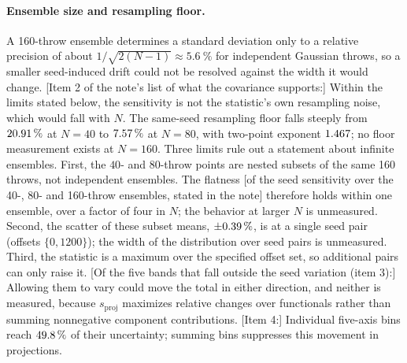 \paragraph{Ensemble size and resampling floor.} A 160-throw ensemble determines a standard deviation only to a relative precision of about $1/\sqrt{2(N-1)}\approx\SI{5.6}{\percent}$ for independent Gaussian throws, so a smaller seed-induced drift could not be resolved against the width it would change. [Item 2 of the note's list of what the covariance supports:] Within the limits stated below, the sensitivity is not the statistic's own resampling noise, which would fall with $N$. The same-seed resampling floor falls steeply from $20.91\,\%$ at $N=40$ to $7.57\,\%$ at $N=80$, with two-point exponent $1.467$; no floor measurement exists at $N=160$. Three limits rule out a statement about infinite ensembles. First, the $40$- and $80$-throw points are nested subsets of the same 160 throws, not independent ensembles. The flatness [of the seed sensitivity over the 40-, 80- and 160-throw ensembles, stated in the note] therefore holds within one ensemble, over a factor of four in $N$; the behavior at larger $N$ is unmeasured. Second, the scatter of these subset means, $\pm0.39\,\%$, is at a single seed pair (offsets $\{0,1200\}$); the width of the distribution over seed pairs is unmeasured. Third, the statistic is a maximum over the specified offset set, so additional pairs can only raise it. [Of the five bands that fall outside the seed variation (item 3):] Allowing them to vary could move the total in either direction, and neither is measured, because $s_{\mathrm{proj}}$ maximizes relative changes over functionals rather than summing nonnegative component contributions. [Item 4:] Individual five-axis bins reach $49.8\,\%$ of their uncertainty; summing bins suppresses this movement in projections.

